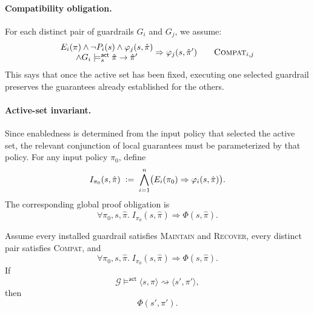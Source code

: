 \paragraph{Compatibility obligation.}
For each distinct pair of guardrails $G_i$ and $G_j$, we assume:
\[
\begin{array}{@{}c@{}}
E_i(\pi)\wedge \neg P_i(s)\wedge \varphi_j(s,\hat\pi)
\\
\wedge G_i \models^{\mathsf{act}}_s \hat\pi \to \hat\pi'
\end{array}
\Rightarrow
\varphi_j(s,\hat\pi')
\qquad
\textsc{Compat}_{i,j}
\]
This says that once the active set has been fixed, executing one selected
guardrail preserves the guarantees already established for the others.

\paragraph{Active-set invariant.}
Since enabledness is determined from the input policy that selected the active
set, the relevant conjunction of local guarantees must be parameterized by that
policy. For any input policy $\pi_0$, define
\begin{equation}
I_{\pi_0}(s,\hat\pi)\;\mathrel{\mathop:}=\;\bigwedge_{i=1}^n \bigl(E_i(\pi_0)\Rightarrow \varphi_i(s,\hat\pi)\bigr).
\label{eq:active-set-invariant}
\end{equation}
The corresponding global proof obligation is
\[
\forall \pi_0,s,\hat\pi.\;
I_{\pi_0}(s,\hat\pi)\Rightarrow \Phi(s,\hat\pi).
\]

\begin{theorem}
\label{thm:frozen-active-set-soundness}
Assume every installed guardrail satisfies \textsc{Maintain} and
\textsc{Recover}, every distinct pair satisfies \textsc{Compat}, and
\[
\forall \pi_0,s,\hat\pi.\;
I_{\pi_0}(s,\hat\pi)\Rightarrow \Phi(s,\hat\pi).
\]
If
\[
\mathcal G \models^{\mathsf{act}} \langle s,\pi\rangle \rightsquigarrow \langle s',\pi'\rangle,
\]
then
\[
\Phi(s',\pi').
\]
\end{theorem}

